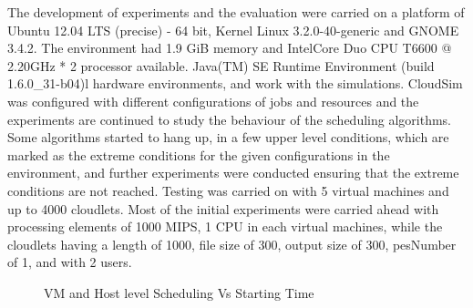 \documentclass[times, 10pt,twocolumn]{article}
\begin{document}
The development of experiments and the evaluation were carried on a platform of Ubuntu 12.04 LTS (precise) - 64 bit, Kernel Linux 3.2.0-40-generic and GNOME 3.4.2. The environment had 1.9 GiB memory and Intel\textregistered Core Duo CPU T6600 @ 2.20GHz * 2 processor available. Java(TM) SE Runtime Environment (build 1.6.0\_31-b04)l hardware environments, and work with the simulations.
CloudSim was configured with different configurations of jobs and resources and the experiments are continued to study the behaviour of the scheduling algorithms. Some algorithms started to hang up, in a few upper level conditions, which are marked as the extreme conditions for the given configurations in the environment, and further experiments were conducted ensuring that the extreme conditions are not reached. Testing was carried on with 5 virtual machines and up to 4000 cloudlets. Most of the initial experiments were carried ahead with processing elements of 1000 MIPS, 1 CPU in each virtual machines, while the cloudlets having a length of 1000, file size of 300, output size of 300, pesNumber of 1, and with 2 users.
\begin{figure}[ht]
 \caption{VM and Host level Scheduling Vs Starting Time}
 \label{fig:start}
\end{figure}
\end{document}
